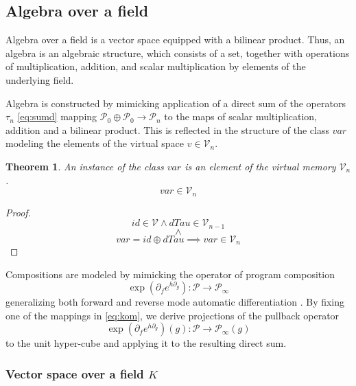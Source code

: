 \documentclass{article}
\newcommand{\VV}{\mathcal{V}}
\newcommand{\dP}{\mathcal{P}}
\newcommand{\D}{\partial}
\newcommand{\sumd}{\tau}
\newtheorem{izrek}{Theorem}[section]
\begin{document}
\subsection{Algebra over a field}\label{sec:Algebra}

 Algebra over a field is a vector space equipped with a bilinear product. Thus, an algebra is an algebraic structure, which consists of a set, together with operations of multiplication, addition, and scalar multiplication by elements of the underlying field. \cite[p.~3]{Algebra}
 
 Algebra is constructed by mimicking application of a direct sum of the operators $\sumd_n$ \eqref{eq:sumd} mapping $\dP_0\oplus\dP_0\to\dP_n$ to the maps of scalar multiplication, addition and a bilinear product. This is reflected in the structure of the class $var$  modeling the elements of the virtual space $v\in\VV_n$. 
 
 \begin{izrek}
 An instance of the class $var$ is an element of the virtual memory $\VV_n$.
  \begin{equation}
  var\in\VV_n
  \end{equation}
 \end{izrek}
 \begin{proof}
 \begin{equation}
  id\in \VV\land  dTau\in \VV_{n-1}
  \end{equation}
  $$\land$$
  \begin{equation}
  var=id\oplus dTau\implies var\in\VV_n
  \end{equation}
 \end{proof}
 
 Compositions are modeled by mimicking the operator of program composition \cite[Theorem~5.6]{OperationalCalculus}
 \begin{equation}\label{eq:kom}
   \exp(\D_fe^{h\D_g}): \dP\to\dP_\infty
   \end{equation}
 generalizing both forward and reverse mode automatic differentiation \cite[Claim~5.3]{OperationalCalculus}. By fixing one of the mappings in \eqref{eq:kom}, we derive projections of the pullback operator
 \begin{equation}\label{eq:komp}
    \exp(\D_fe^{h\D_g})(g): \dP\to\dP_\infty(g)
    \end{equation}
  to the unit hyper-cube and applying it to the resulting direct sum.

\subsubsection{Vector space over a field $K$}\label{sec:vectorSpace}
 
\end{document}
